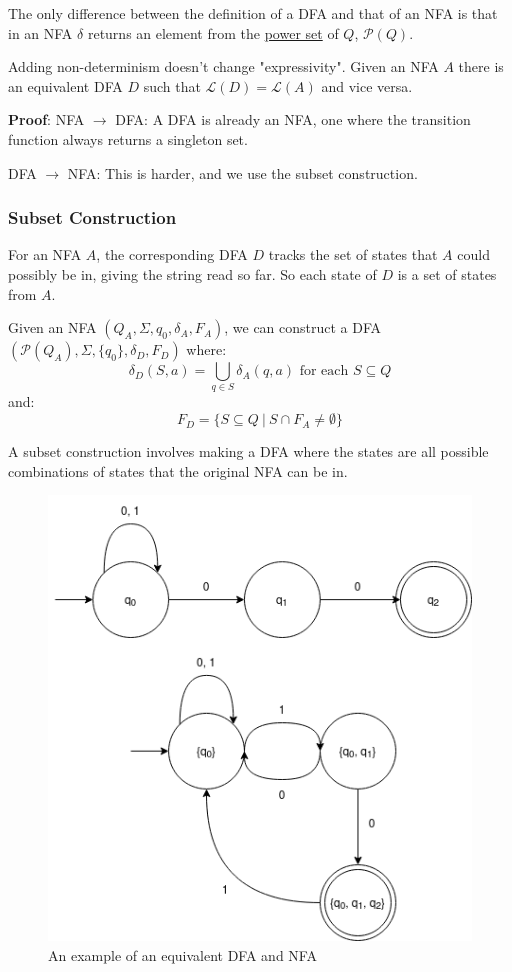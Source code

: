 \documentclass{article}
\begin{document}
The only difference between the definition of a DFA and that of an NFA is that in an NFA $\delta$ returns an element from the \hyperref[power-set]{power set} of $Q$, $\mathcal{P}(Q)$.

Adding non-determinism doesn't change "expressivity". Given an NFA $A$ there is an equivalent DFA $D$ such that $\mathcal{L}(D)=\mathcal{L}(A)$ and vice versa.

\textbf{Proof}:
NFA $\to$ DFA: A DFA is already an NFA, one where the transition function always returns a singleton set.

DFA $\to$ NFA: This is harder, and we use the subset construction.

\subsubsection{Subset Construction}\label{subset-construction}
For an NFA $A$, the corresponding DFA $D$ tracks the set of states that $A$ could possibly be in, giving the string read so far. So each state of $D$ is a set of states from $A$.

Given an NFA $(Q_A, \Sigma, q_0, \delta_A, F_A)$, we can construct a DFA $(\mathcal{P}(Q_A), \Sigma, \{q_0\}, \delta_D, F_D)$ where:
\[\delta_D(S,a)=\bigcup_{q \in S} \delta_A(q, a) \text{ for each }S \subseteq Q\]
and:
\[F_D=\{S \subseteq Q \:|\: S \cap F_A \neq \emptyset\}\]

A subset construction involves making a DFA where the states are all possible combinations of states that the original NFA can be in.

\begin{figure}[H]
    \centering
    \includegraphics[scale=0.5]{images/subset-construction.png}
    \caption{An example of an equivalent DFA and NFA}
    \label{fig:subset-construction}
\end{figure}
\end{document}
